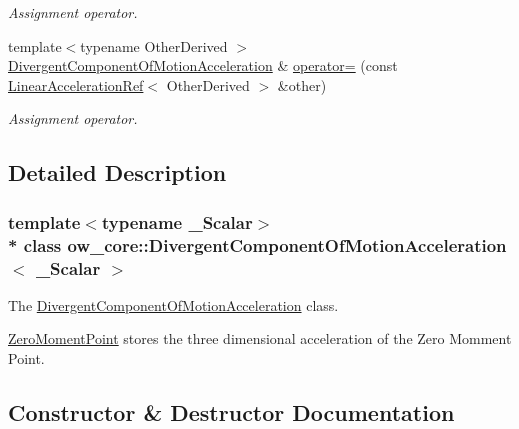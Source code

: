 \begin{DoxyCompactItemize}
\begin{DoxyCompactList}\small\item\em Assignment operator. \end{DoxyCompactList}\item 
{\footnotesize template$<$typename Other\+Derived $>$ }\\\hyperlink{classow__core_1_1DivergentComponentOfMotionAcceleration}{Divergent\+Component\+Of\+Motion\+Acceleration} \& \hyperlink{classow__core_1_1DivergentComponentOfMotionAcceleration_a9be91642d958087dcbc97d901b7c187f}{operator=} (const \hyperlink{classow__core_1_1LinearAccelerationRef}{Linear\+Acceleration\+Ref}$<$ Other\+Derived $>$ \&other)\hypertarget{classow__core_1_1DivergentComponentOfMotionAcceleration_a9be91642d958087dcbc97d901b7c187f}{}\label{classow__core_1_1DivergentComponentOfMotionAcceleration_a9be91642d958087dcbc97d901b7c187f}

\begin{DoxyCompactList}\small\item\em Assignment operator. \end{DoxyCompactList}\end{DoxyCompactItemize}


\subsection{Detailed Description}
\subsubsection*{template$<$typename \+\_\+\+Scalar$>$\\*
class ow\+\_\+core\+::\+Divergent\+Component\+Of\+Motion\+Acceleration$<$ \+\_\+\+Scalar $>$}

The \hyperlink{classow__core_1_1DivergentComponentOfMotionAcceleration}{Divergent\+Component\+Of\+Motion\+Acceleration} class. 

\hyperlink{classow__core_1_1ZeroMomentPoint}{Zero\+Moment\+Point} stores the three dimensional acceleration of the Zero Momment Point. 

\subsection{Constructor \& Destructor Documentation}
